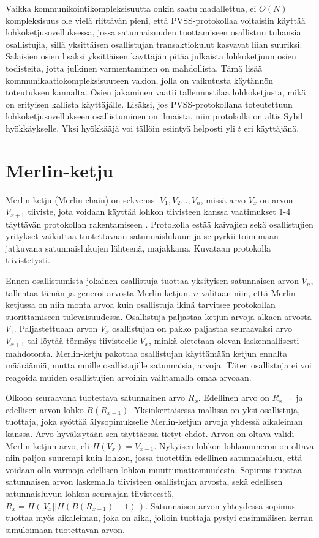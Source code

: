 Vaikka kommunikointikompleksisuutta onkin saatu madallettua, ei $O(N)$ kompleksisuus ole vielä riittävän pieni, että PVSS-protokollaa voitaisiin käyttää lohkoketjusovelluksessa, jossa satunnaisuuden tuottamiseen osallistuu tuhansia osallistujia, sillä yksittäisen osallistujan transaktiokulut kasvavat liian suuriksi. Salaisien osien lisäksi yksittäisen käyttäjän pitää julkaista lohkoketjuun osien todisteita, jotta julkinen varmentaminen on mahdollista. Tämä lisää kommunikaatiokompleksisuuteen vakion, jolla on vaikutusta käytännön toteutuksen kannalta. Osien jakaminen vaatii tallennustilaa lohkoketjusta, mikä on erityisen kallista käyttäjälle. Lisäksi, jos PVSS-protokollana toteutettuun lohkoketjusovellukseen osallistuminen on ilmaista, niin protokolla on altis Sybil hyökkäykselle. Yksi hyökkääjä voi tällöin esiintyä helposti yli $t$ eri käyttäjänä.

\section{Merlin-ketju }

Merlin-ketju (Merlin chain) on sekvenssi $V_1, V_2 ... , V_n$, missä arvo $V_x$ on arvon $V_{x+1}$ tiiviste, jota voidaan käyttää lohkon tiivisteen kanssa vaatimukset 1-4 täyttävän protokollan rakentamiseen \cite{MerlinChains}. Protokolla estää kaivajien sekä osallistujien yritykset vaikuttaa tuotettavaan satunnaislukuun ja se pyrkii toimimaan jatkuvana satunnaislukujen lähteenä, majakkana. Kuvataan protokolla tiivistetysti.

Ennen osallistumista jokainen osallistuja tuottaa yksityisen satunnaisen arvon $V_n$, tallentaa tämän ja generoi arvosta Merlin-ketjun. $n$ valitaan niin, että Merlin-ketjussa on niin monta arvoa kuin osallistuja ikinä tarvitsee protokollan suorittamiseen tulevaisuudessa. Osallistuja paljastaa ketjun arvoja alkaen arvosta $V_1$. Paljastettuaan arvon $V_x$ osallistujan on pakko paljastaa seuraavaksi arvo $V_{x+1}$ tai löytää törmäys tiivisteelle $V_x$, minkä oletetaan olevan laskennallisesti mahdotonta. Merlin-ketju pakottaa osallistujan käyttämään ketjun ennalta määräämiä, mutta muille osallistujille satunnaisia, arvoja. Täten osallistuja ei voi reagoida muiden osallistujien arvoihin vaihtamalla omaa arvoaan.  

Olkoon seuraavana tuotettava satunnainen arvo $R_x$. Edellinen arvo on $R_{x-1}$ ja edellisen arvon lohko $B(R_{x-1})$.
Yksinkertaisessa mallissa on yksi osallistuja, tuottaja, joka syöttää älysopimukselle Merlin-ketjun arvoja yhdessä aikaleiman kanssa. Arvo hyväksytään sen täyttäessä tietyt ehdot. Arvon on oltava validi Merlin ketjun arvo, eli $H(V_x) = V_{x-1}$. Nykyisen lohkon lohkonumeron on oltava niin paljon suurempi kuin lohkon, jossa tuotettiin edellinen satunnaisluku, että voidaan olla varmoja edellisen lohkon muuttumattomuudesta. Sopimus tuottaa satunnaisen arvon laskemalla tiivisteen osallistujan arvosta, sekä edellisen satunnaisluvun lohkon seuraajan tiivisteestä, $R_x = H(\, V_x || H(B(R_{x-1})+1) \,)$. Satunnaisen arvon yhteydessä sopimus tuottaa myös aikaleiman, joka on aika, jolloin tuottaja pystyi ensimmäisen kerran simuloimaan tuotettavan arvon. 

